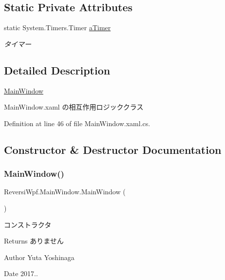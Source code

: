 \subsection*{Static Private Attributes}
\begin{DoxyCompactItemize}
\item 
\mbox{\label{class_reversi_wpf_1_1_main_window_ae8295758a928a2a94fa5e0a5e1a75f25}} 
static System.\+Timers.\+Timer \hyperlink{class_reversi_wpf_1_1_main_window_ae8295758a928a2a94fa5e0a5e1a75f25}{a\+Timer}
\begin{DoxyCompactList}\small\item\em タイマー \end{DoxyCompactList}\end{DoxyCompactItemize}


\subsection{Detailed Description}
\hyperlink{class_reversi_wpf_1_1_main_window}{Main\+Window} 

Main\+Window.\+xaml の相互作用ロジッククラス

Definition at line 46 of file Main\+Window.\+xaml.\+cs.



\subsection{Constructor \& Destructor Documentation}
\mbox{\label{class_reversi_wpf_1_1_main_window_af64ecb3857a3d547b4020e9900048360}} 
\subsubsection{\texorpdfstring{Main\+Window()}{MainWindow()}}
{\footnotesize\ttfamily Reversi\+Wpf.\+Main\+Window.\+Main\+Window (\begin{DoxyParamCaption}{ }\end{DoxyParamCaption})}



コンストラクタ 

\begin{DoxyReturn}{Returns}
ありません 
\end{DoxyReturn}
\begin{DoxyAuthor}{Author}
Yuta Yoshinaga 
\end{DoxyAuthor}
\begin{DoxyDate}{Date}
2017.. 
\end{DoxyDate}


